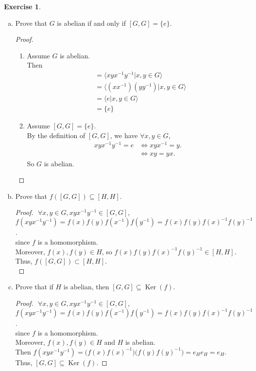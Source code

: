 \documentclass{amsart}
\renewcommand{\ker}{\operatorname{Ker}}
\theoremstyle{plain}
\theoremstyle{definition}
\newtheorem{exer}[lem]{Exercise}
\begin{document}
\begin{exer}
\begin{enumerate}[(a)]
\item Prove that $G$ is abelian if and only if $[G,G]=\{e\}$.
	\begin{proof}
		$ $\newline
		\begin{enumerate}
			\item 
				Assume $G$ is abelian.\\
				Then 
				\begin{align*}
				[G,G] &= \langle xyx^{-1}y^{-1} |x,y \in G\rangle \\
			    	  &= \langle (xx^{-1})(yy^{-1}) |x,y \in G \rangle \\
			    	  &= \langle e |x,y \in G \rangle \\
			    	  & = \{e\}
				\end{align*}	
			\item
				Assume $[G,G] = \{e\}$.\\ 
				By the definition of $[G,G]$, we have 
				$\forall x,y \in G$,
				\begin{align*}
					xyx^{-1}y^{-1} = e  & \Longleftrightarrow xyx^{-1} = y. \\
										& \Longleftrightarrow xy = yx. 
				\end{align*}
				So $G$ is abelian.
		\end{enumerate}
	\end{proof}
\item Prove that $f([G,G])\subseteq[H,H]$.
	\begin{proof}
		$ $\newline
		$\forall x,y \in G, xyx^{-1}y^{-1} \in [G,G]$,\\
		$f(xyx^{-1}y^{-1}) = f(x)f(y)f(x^{-1})f(y^{-1}) = f(x)f(y){f(x)}^{-1}{f(y)}^{-1}$. \\
		since $f$ is a homomorphism.\\
		Moreover, $f(x), f(y) \in H$, so $f(x)f(y){f(x)}^{-1}{f(y)}^{-1} \in [H,H]$.\\
		Thus, $f([G,G]) \subset [H,H]$.\\
	\end{proof}
\item Prove that if $H$ is abelian, then $[G,G]\subseteq\ker(f)$.
	\begin{proof}
		$ $\newline
		$\forall x,y \in G, xyx^{-1}y^{-1} \in [G,G]$,\\
		$f(xyx^{-1}y^{-1}) = f(x)f(y)f(x^{-1})f(y^{-1}) = f(x)f(y){f(x)}^{-1}{f(y)}^{-1}$. \\
		since $f$ is a homomorphism.\\
		Moreover, $f(x), f(y) \in H$ and $H$ is abelian. \\
		Then $f(xyx^{-1}y^{-1}) = \Big(f(x){f(x)}^{-1}\Big)\Big(f(y){f(y)}^{-1}\Big) = e_He_H = e_H$.\\
		Thus, $[G,G]\subseteq\ker(f)$.
	\end{proof}
\end{enumerate}
\end{exer}
\end{document}
